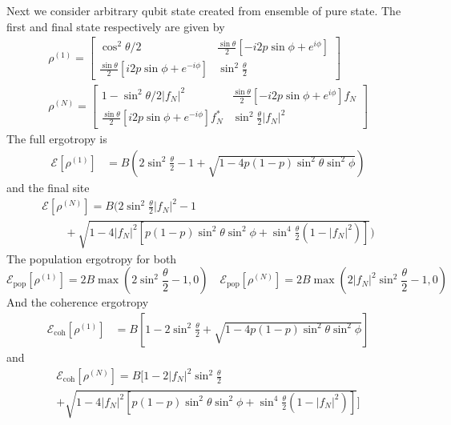 \documentclass[../../../main.tex]{subfiles}
\begin{document}
Next we consider arbitrary qubit state created from ensemble of pure state.
The first and final state respectively are given by
\begin{gather*}
  \rho ^{(1)} =
  \begin{bmatrix}
    \cos ^2 \theta/2                                                 & \frac{\sin \theta}{2} \left[-i2p \sin \phi + e^{i\phi}  \right] \\
    \frac{\sin \theta  }{2} \left[i2p \sin\phi + e^{-i\phi}  \right] & \sin ^2 \frac{\theta  }{2}
  \end{bmatrix}    \\
  \rho ^{(N)}  =
  \begin{bmatrix}
    1- \sin^2 \theta/2 |f_N|^2                                             & \frac{\sin \theta}{2} \left[-i2p \sin \phi + e^{i\phi}  \right]f_N \\
    \frac{\sin \theta  }{2} \left[i2p \sin\phi + e^{-i\phi}  \right]f_N ^* & \sin ^2 \frac{\theta  }{2}|f_N|^2
  \end{bmatrix}
\end{gather*}
The full ergotropy is
\begin{align*}
  \mathcal{E} \left[ \rho^{(1)} \right]
   & = B \left( 2\sin^2 \frac{\theta }{2} - 1 + \sqrt{1 - 4p(1-p)\sin ^2\theta \sin^2 \phi}  \right)
\end{align*}
and the final site
\begin{multline*}
  \mathcal{E} \left[ \rho^{(N)} \right]     = B \bigg( 2\sin^2 \frac{\theta }{2} |f_N|^2 - 1
  \\  \qquad+  \sqrt{1 - 4|f_N|^2 \left[ p(1-p)\sin ^2\theta \sin^2 \phi + \sin ^4 \frac{\theta }{2 }(1-|f_N|^2) \right]}  \bigg)
\end{multline*}
The population ergotropy for both
\begin{equation*}
  \mathcal{E}_\text{pop} \left[ \rho^{(1)} \right]= 2B\max(2 \sin^2 \frac{\theta }{2 }-1,0)  \quad
  \mathcal{E}_\text{pop} \left[ \rho^{(N)} \right]= 2B\max(2 |f_N|^2\sin ^2\frac{\theta}{2 }-1,0)
\end{equation*}
And the coherence ergotropy
\begin{align*}
  \mathcal{E}_\text{coh}\left[ \rho^{(1)}\right]
   & = B \left[  1 - 2 \sin ^2 \frac{\theta }{2} + \sqrt{1-4p(1-p)\sin ^2\theta \sin^2 \phi}  \right]
\end{align*}
and
\begin{multline*}
  \mathcal{E}_\text{coh}\left[ \rho^{(N)}\right]
  = B \bigg[  1 - 2 |f_N|^2\sin ^2 \frac{\theta }{2} \\
    + \sqrt{1-4 |f_N|^2 \left[ p(1-p)\sin ^2\theta \sin^2 \phi
        + \sin ^4 \frac{\theta }{2 }(1-|f_N|^2) \right] }  \bigg]
\end{multline*}
\end{document}

